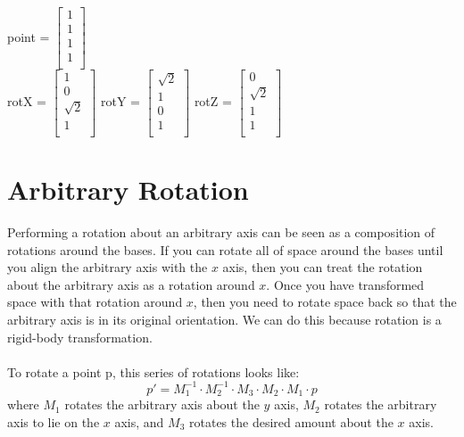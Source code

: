 \documentclass[10pt,twocolumn]{article}
\begin{document}
\begin{framed}
point = $\begin{bmatrix}
1 \\
1 \\
1 \\
1 \\
\end{bmatrix}$\\
rotX = $\begin{bmatrix}
1 \\
0 \\
\sqrt{2} \\
1 \\
\end{bmatrix}$
rotY = $\begin{bmatrix}
\sqrt{2}\\
1 \\
0 \\
1\\
\end{bmatrix}$
rotZ = $\begin{bmatrix}
0 \\
\sqrt{2}\\
1 \\
1\\
\end{bmatrix}$

\end{framed}

\section{Arbitrary Rotation}
Performing a rotation about an arbitrary axis can be seen as a composition of rotations around the bases. If you can rotate all of space around the bases until you align the arbitrary axis with the $x$ axis, then you can treat the rotation about the arbitrary axis as a rotation around $x$. Once you have transformed space with that rotation around $x$, then you need to rotate space back so that the arbitrary axis is in its original orientation. We can do this because rotation is a rigid-body transformation.\\\\
To rotate a point p, this series of rotations looks like:
\[p' = M^{-1}_1\cdot M^{-1}_2 \cdot M_3 \cdot M_2 \cdot M_1 \cdot p\]
where $M_1$ rotates the arbitrary axis about the $y$ axis, $M_2$ rotates the arbitrary axis to lie on the $x$ axis, and $M_3$ rotates the desired amount about the $x$ axis.
\end{document}
